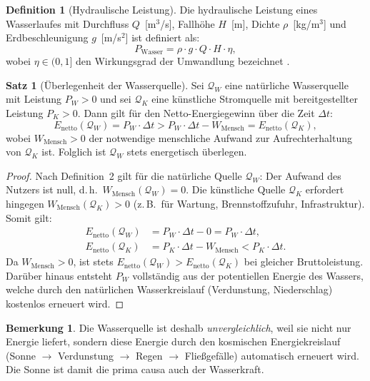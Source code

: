 ﻿\documentclass[a4paper,12pt]{article}
\theoremstyle{definition}
\newtheorem{definition}{Definition}
\newtheorem{satz}{Satz}
\newtheorem{bemerkung}{Bemerkung}
\begin{document}
\begin{definition}[Hydraulische Leistung]
    Die hydraulische Leistung eines Wasserlaufes mit Durchfluss $Q$~[m$^3$/s],
    Fallh\"ohe $H$~[m], Dichte $\rho$~[kg/m$^3$] und Erdbeschleunigung $g$~[m/s$^2$]
    ist definiert als:
    \[
        P_{\mathrm{Wasser}} = \rho \cdot g \cdot Q \cdot H \cdot \eta,
    \]
    wobei $\eta \in (0,1]$ den Wirkungsgrad der Umwandlung bezeichnet
    \cite{Muller2015Wasser}.
\end{definition}

\begin{satz}[\"Uberlegenheit der Wasserquelle]
\label{satz:wasser}
    Sei $\mathcal{Q}_W$ eine nat\"urliche Wasserquelle mit Leistung $P_W > 0$ und
    sei $\mathcal{Q}_K$ eine k\"unstliche Stromquelle mit bereitgestellter Leistung
    $P_K > 0$. Dann gilt f\"ur den Netto-Energiegewinn \"uber die Zeit $\Delta t$:
    \[
        E_{\mathrm{netto}}(\mathcal{Q}_W) = P_W \cdot \Delta t > P_W \cdot \Delta t - W_{\mathrm{Mensch}}
        = E_{\mathrm{netto}}(\mathcal{Q}_K),
    \]
    wobei $W_{\mathrm{Mensch}} > 0$ der notwendige menschliche Aufwand zur Aufrechterhaltung
    von $\mathcal{Q}_K$ ist. Folglich ist $\mathcal{Q}_W$ stets energetisch \"uberlegen.
\end{satz}

\begin{proof}
    Nach Definition~2 gilt f\"ur die nat\"urliche Quelle $\mathcal{Q}_W$: Der Aufwand
    des Nutzers ist null, d.\,h.\ $W_{\mathrm{Mensch}}(\mathcal{Q}_W) = 0$. Die
    k\"unstliche Quelle $\mathcal{Q}_K$ erfordert hingegen $W_{\mathrm{Mensch}}(\mathcal{Q}_K) > 0$
    (z.\,B.\ f\"ur Wartung, Brennstoffzufuhr, Infrastruktur). Somit gilt:
    \begin{align*}
        E_{\mathrm{netto}}(\mathcal{Q}_W) &= P_W \cdot \Delta t - 0 = P_W \cdot \Delta t,\\
        E_{\mathrm{netto}}(\mathcal{Q}_K) &= P_K \cdot \Delta t - W_{\mathrm{Mensch}} < P_K \cdot \Delta t.
    \end{align*}
    Da $W_{\mathrm{Mensch}} > 0$, ist stets $E_{\mathrm{netto}}(\mathcal{Q}_W) > E_{\mathrm{netto}}(\mathcal{Q}_K)$
    bei gleicher Bruttoleistung. Dar\"uber hinaus entsteht $P_W$ vollst\"andig aus
    der potentiellen Energie des Wassers, welche durch den nat\"urlichen Wasserkreislauf
    (Verdunstung, Niederschlag) kostenlos erneuert wird. \qedhere
\end{proof}

\begin{bemerkung}
    Die Wasserquelle ist deshalb \emph{unvergleichlich}, weil sie nicht nur Energie
    liefert, sondern diese Energie durch den kosmischen Energiekreislauf (Sonne $\to$
    Verdunstung $\to$ Regen $\to$ Flie\ss{}gef\"alle) automatisch erneuert wird.
    Die Sonne ist damit die prima causa auch der Wasserkraft.
\end{bemerkung}
\end{document}

